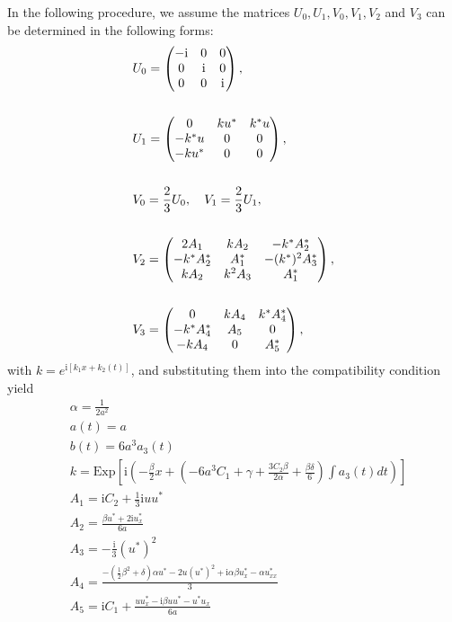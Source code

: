 \documentclass[12pt]{article}
\begin{document}
In the following procedure, we assume the matrices $U_{0}, U_{1}, V_{0}, V_{1}, V_{2}$ and $V_{3}$ can be determined in the following forms:
\begin{align}
  & U_{0} = \begin{pmatrix}
             -\mathrm{i} & 0 & 0 \\
              0 & \mathrm{i} & 0 \\
              0 & 0 & \mathrm{i}
            \end{pmatrix}, \label{4} \\ \notag\\
  & U_{1} = \begin{pmatrix}
              0 & ku^{*} & k^{*}u \\
              -k^{*}u & 0 & 0 \\
              -ku^{*} & 0 & 0
            \end{pmatrix}, \label{5} \\ \notag\\
  & V_{0} = \frac{2}{3}U_{0}, \quad V_{1} = \frac{2}{3}U_{1}, \\ \notag\\
  & V_{2} = \begin{pmatrix}
              2A_{1} & kA_{2} & -k^{*}A_{2}^{*} \\
              -k^{*}A_{2}^{*} & A_{1}^{*} & -(k^{*})^{2}A_{3}^{*} \\
              kA_{2} & k^{2}A_{3} & A_{1}^{*}
            \end{pmatrix}, \\ \notag\\
  & V_{3} = \begin{pmatrix}
              0 & kA_{4} & k^{*}A_{4}^{*} \\
              -k^{*}A_{4}^{*} & A_{5} & 0 \\
              -kA_{4} & 0 & A_{5}^{*}
            \end{pmatrix}, \label{8}
\end{align}
with $k=e^{\mathrm{i}[k_{1}x + k_{2}(t)]}$, and substituting them into the compatibility condition yield
\begin{align}
  & \alpha = \frac{1}{2a^{2}} \\
  & a(t) = a \\
  & b(t) = 6a^{3}a_{3}(t) \\
  & k = \mathrm{Exp}\left[\mathrm{i}\left(-\frac{\beta}{2}x + \left( -6a^{3}C_{1} + \gamma + \frac{3C_{2}\beta}{2\alpha} + \frac{\beta\delta}{6}\right) \int a_{3}(t)dt \right)\right] \\
  & A_{1} = \mathrm{i}C_{2} + \frac{1}{3}\mathrm{i}uu^{*} \\
  & A_{2} = \frac{\beta u^{*} + 2\mathrm{i}u^{*}_{x}}{6a} \\
  & A_{3} = -\frac{\mathrm{i}}{3}(u^{*})^{2} \\
  & A_{4} = \frac{-(\frac{1}{2}\beta^{2}+\delta)\alpha u^{*} - 2u(u^{*})^{2} + \mathrm{i}\alpha\beta u^{*}_{x} - \alpha u^{*}_{xx}}{3}  \\
  & A_{5} = \mathrm{i}C_{1} + \frac{uu^{*}_{x} - \mathrm{i}\beta uu^{*} - u^{*}u_{x}}{6a}
\end{align}
\end{document}

